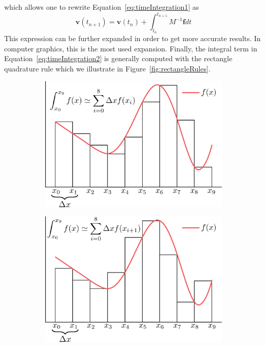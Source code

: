 which allows one to rewrite Equation~\eqref{eq:timeIntegration1} as
\begin{equation}
\label{eq:timeIntegration2}
\mathbf{v}(t_{n+1}) = \mathbf{v}(t_{n}) + \int_{t_{n}}^{t_{n+1}} M^{-1}\mathbf{f}dt
\end{equation}
This expression can be further expanded in order to get more accurate results. In computer graphics, this is the most used expansion. Finally, the integral term in Equation~\eqref{eq:timeIntegration2} is generally computed with the rectangle quadrature rule which we illustrate in Figure~\ref{fig:rectangleRules}.
\begin{figure}[!ht]
	\centering
	\begin{subfigure}[b]{0.46\linewidth}
		\centering
		\includegraphics[width=\linewidth]{images/continuum_mechanics/rectangleRule_left.png}
		\caption{\label{fig:leftRectangleRule}}
	\end{subfigure}
	\hspace{0.2cm}
	\begin{subfigure}[b]{0.46\linewidth}
		\centering
		\includegraphics[width=\linewidth]{images/continuum_mechanics/rectangleRule_right.png}

\end{subfigure}
\end{figure}
